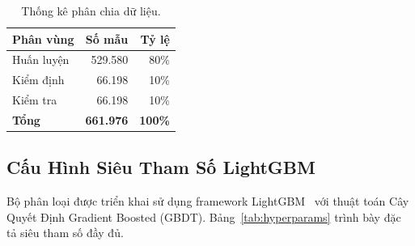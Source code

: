 \documentclass[a4paper,12pt]{article}
\begin{document}
\begin{table}[H]
\centering
\caption{Thống kê phân chia dữ liệu.}
\label{tab:split}
\begin{tabular}{lrr}
\toprule
\textbf{Phân vùng} & \textbf{Số mẫu} & \textbf{Tỷ lệ} \\
\midrule
Huấn luyện  & 529.580 & 80\% \\
Kiểm định   &  66.198 & 10\% \\
Kiểm tra    &  66.198 & 10\% \\
\midrule
\textbf{Tổng} & \textbf{661.976} & \textbf{100\%} \\
\bottomrule
\end{tabular}
\end{table}

\subsection{Cấu Hình Siêu Tham Số LightGBM}
\label{sec:hyperparams}

Bộ phân loại được triển khai sử dụng framework LightGBM~\cite{lightgbm} với thuật toán Cây Quyết Định Gradient Boosted (GBDT). Bảng~\ref{tab:hyperparams} trình bày đặc tả siêu tham số đầy đủ.
\end{document}
